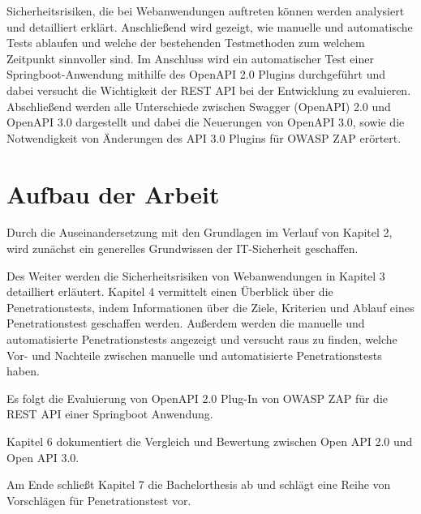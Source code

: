 Sicherheitsrisiken, die bei Webanwendungen auftreten können werden analysiert und detailliert erklärt. Anschließend wird gezeigt, wie manuelle und automatische Tests ablaufen und welche der bestehenden Testmethoden zum welchem Zeitpunkt sinnvoller sind. Im Anschluss wird ein automatischer Test einer Springboot-Anwendung mithilfe des OpenAPI 2.0 Plugins durchgeführt und dabei versucht die Wichtigkeit der REST API bei der Entwicklung zu evaluieren. Abschließend werden alle Unterschiede zwischen Swagger (OpenAPI) 2.0 und OpenAPI 3.0 dargestellt und dabei die Neuerungen von OpenAPI 3.0, sowie die Notwendigkeit von Änderungen des API 3.0 Plugins für OWASP ZAP erörtert.

\section{Aufbau der Arbeit}

Durch die Auseinandersetzung mit den Grundlagen im Verlauf von Kapitel 2, wird zunächst ein generelles Grundwissen der IT-Sicherheit geschaffen.

Des Weiter werden die Sicherheitsrisiken von Webanwendungen in Kapitel 3  detailliert erläutert. Kapitel 4 vermittelt einen Überblick über die Penetrationstests, indem Informationen über die Ziele, Kriterien und Ablauf eines Penetrationstest geschaffen werden. Außerdem werden die manuelle und automatisierte Penetrationstests angezeigt und versucht raus zu finden, welche Vor- und Nachteile zwischen manuelle und automatisierte Penetrationstests haben. 

Es folgt die Evaluierung von OpenAPI 2.0 Plug-In von OWASP ZAP für die REST API einer Springboot Anwendung. 

Kapitel 6 dokumentiert die Vergleich und Bewertung zwischen Open API 2.0 und Open API 3.0. 

Am Ende schließt Kapitel 7 die Bachelorthesis ab und schlägt eine Reihe von Vorschlägen für Penetrationstest vor.

